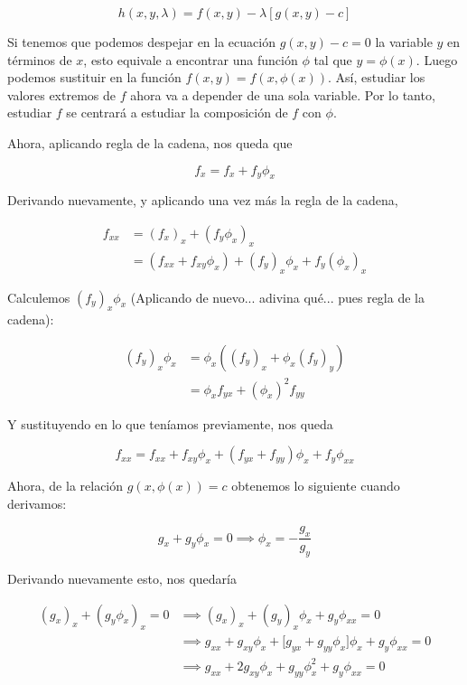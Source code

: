 \[
h(x, y, \lambda) = f(x,y) - \lambda \left[ g(x,y) - c \right]
\]

Si tenemos que podemos despejar en la ecuación $g(x,y) - c = 0$ la variable $y$ en términos de $x$, esto equivale a encontrar una función $\phi$ tal que $y = \phi(x)$. Luego podemos sustituir en la función $f(x,y) = f\left(x, \phi(x)\right)$. Así, estudiar los valores extremos de $f$ ahora va a depender de una sola variable. Por lo tanto, estudiar $f$ se centrará a estudiar la composición de $f$ con $\phi$.

Ahora, aplicando regla de la cadena, nos queda que

\begin{equation}\label{eq:8.3.1}
    f_x = f_x + f_y\phi_x
\end{equation}

Derivando nuevamente, y aplicando una vez más la regla de la cadena,

\begin{align*}
    f_{xx} &= (f_x)_x + (f_y\phi_x)_x \\
        &= (f_{xx} + f_{xy}\phi_x) + (f_y)_x\phi_x + f_y(\phi_x)_x
\end{align*}

Calculemos $(f_y)_x\phi_x$ (Aplicando de nuevo... adivina qué... pues regla de la cadena):

\begin{align*}
    (f_y)_x\phi_x &= \phi_x((f_y)_x + \phi_x(f_y)_y) \\
        &= \phi_xf_{yx} + (\phi_x)^2f_{yy}
\end{align*}

Y sustituyendo en lo que teníamos previamente, nos queda

\begin{equation}\label{eq:8.3.2}
    f_{xx} = f_{xx} + f_{xy}\phi_x + (f_{yx} + f_{yy})\phi_x + f_y\phi_{xx}
\end{equation}

Ahora, de la relación $g(x, \phi(x)) = c$ obtenemos lo siguiente cuando derivamos:

\begin{equation}\label{eq:8.3.3}
    g_x + g_y\phi_x = 0 \implies \phi_x = -\frac{g_x}{g_y}
\end{equation}

Derivando nuevamente esto, nos quedaría

\begin{align}\label{eq:8.3.4}
    (g_x)_x + (g_y\phi_x)_x = 0 &\implies (g_x)_x + (g_y)_x\phi_x + g_y\phi_{xx} = 0 \nonumber \\
        &\implies g_{xx} + g_{xy}\phi_x + \Big[ g_{yx} + g_{yy}\phi_x \Big]\phi_x + g_y\phi_{xx} = 0 \nonumber \\
        &\implies g_{xx} + 2g_{xy}\phi_x + g_{yy}\phi_x^2 + g_y\phi_{xx} = 0
\end{align}

